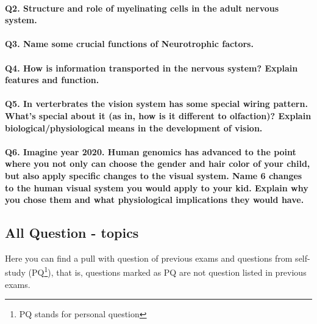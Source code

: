 \documentclass[12pt,article,oneside,a4paper]{memoir}
\begin{document}
\paragraph{Q2. Structure and role of myelinating cells in the adult nervous system.}
\paragraph{Q3. Name some crucial functions of Neurotrophic factors.}
\paragraph{Q4. How is information transported in the nervous system? Explain features and function.}
\paragraph{Q5. In verterbrates the vision system has some special wiring pattern. What's special about it (as in, how is it different to olfaction)? Explain biological/physiological means in the development of vision.}
\paragraph{Q6. Imagine year 2020. Human genomics has advanced to the point where you not only can choose the gender and hair color of your child, but also apply specific changes to the visual system. Name 6 changes to the human visual system you would apply to your kid. Explain why you chose them and what physiological implications they would have.}

\newpage
\subsection{All Question - topics}

Here you can find a pull with question of previous exams and questions from self-study (PQ\footnote{PQ stands for personal question}), that is, questions marked as PQ are not question listed in previous exams.

\end{document}
